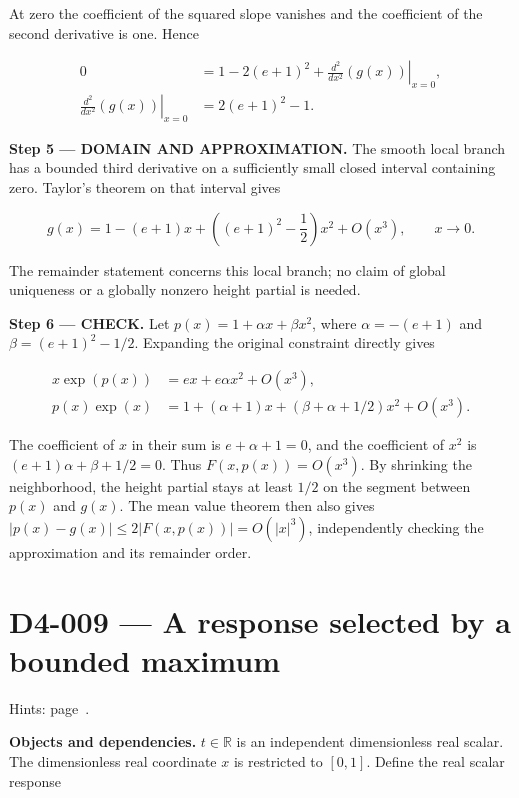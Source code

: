 \documentclass[11pt,oneside,openany]{book}
\begin{document}
At zero the coefficient of the squared slope vanishes and the coefficient of the second derivative is one. Hence

\[
\begin{aligned}
0&=1-2(e+1)^2+\left.\frac{d^2}{dx^2}\left(g(x)\right)\right|_{x=0},\\
\left.\frac{d^2}{dx^2}\left(g(x)\right)\right|_{x=0}&=2(e+1)^2-1.
\end{aligned}
\]

\begin{DomainStep}
\textbf{Step 5 --- DOMAIN AND APPROXIMATION.} The smooth local branch has a bounded third derivative on a sufficiently small closed interval containing zero. Taylor's theorem on that interval gives

\[
g(x)=1-(e+1)x+\left((e+1)^2-\frac12\right)x^2+O(x^3),\qquad x\to0.
\]

The remainder statement concerns this local branch; no claim of global uniqueness or a globally nonzero height partial is needed.

\end{DomainStep}
\textbf{Step 6 --- CHECK.} Let \(p(x)=1+\alpha x+\beta x^2\), where \(\alpha=-(e+1)\) and \(\beta=(e+1)^2-1/2\). Expanding the original constraint directly gives

\[
\begin{aligned}
x\exp(p(x))&=ex+e\alpha x^2+O(x^3),\\
p(x)\exp(x)&=1+(\alpha+1)x+(\beta+\alpha+1/2)x^2+O(x^3).
\end{aligned}
\]

The coefficient of \(x\) in their sum is \(e+\alpha+1=0\), and the coefficient of \(x^2\) is \((e+1)\alpha+\beta+1/2=0\). Thus \(F(x,p(x))=O(x^3)\). By shrinking the neighborhood, the height partial stays at least \(1/2\) on the segment between \(p(x)\) and \(g(x)\). The mean value theorem then also gives \(|p(x)-g(x)|\le2|F(x,p(x))|=O(|x|^3)\), independently checking the approximation and its remainder order.
\clearpage
\section{D4-009 --- A response selected by a bounded maximum}
\label{problem:D4-009}
{\small Hints: page~\pageref{hints:D4-009}.}\par\medskip

\textbf{Objects and dependencies.} \(t\in\mathbb R\) is an independent dimensionless real scalar. The dimensionless real coordinate \(x\) is restricted to \([0,1]\). Define the real scalar response
\end{document}
